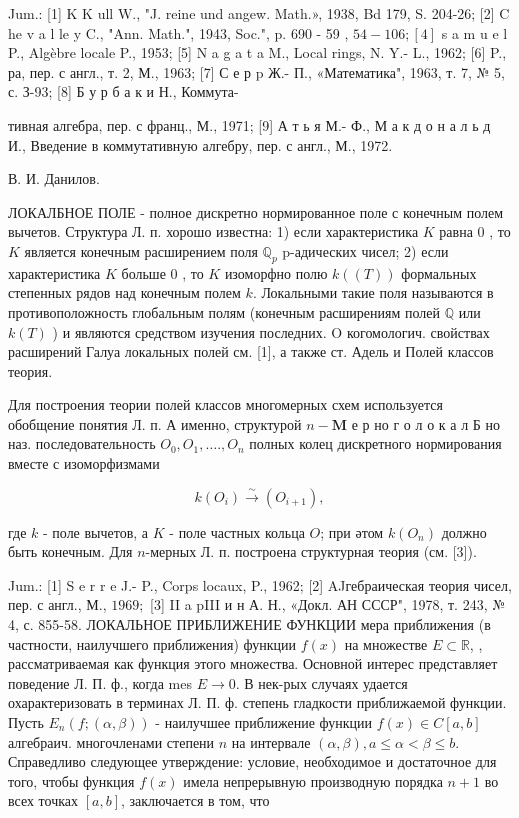\documentclass[10pt]{article}
\begin{document}
Jum.: [1] K $\mathrm{K}$ ull $\mathrm{W} .$, "J. reine und angew. Math.», 1938, Bd 179, S. 204-26; [2] C he v a l le y C., "Ann. Math.", 1943, Soc.", p. 690 - 59 , $54-106 ;[4]$ s a m u e l P., Algèbre locale P., 1953; [5] N a g a t a M., Local rings, N. Y.- L., 1962; [6] P., ра, пер. с англ., т. 2, М., 1963; [7] С е р p Ж.- П., «Математика", 1963, т. 7, № 5, с. З-93; [8] Б у р б а к и Н., Коммута-

тивная алгебра, пер. с франц., М., 1971; [9] А т ь я М.- Ф., М а к д о н а л ь д И., Введение в коммутативную алгебру, пер. с англ., М., 1972.



В. И. Данилов.



ЛОКАЛБНОЕ ПОЛЕ - полное дискретно нормированное поле с конечным полем вычетов. Структура Л. п. хорошо известна: 1) если характеристика $K$ равна 0 , то $K$ является конечным расширением поля $\mathbb{Q}_{p}$ p-адических чисел; 2) если характеристика $K$ больше 0 , то $K$ изоморфно полю $k((T))$ формальных степенных рядов над конечным полем $k$. Локальными такие поля называются в противоположность глобальным полям (конечным расширениям полей $\mathbb{Q}$ или $k(T)$ ) и являются средством изучения последних. $\mathrm{O}$ когомологич. свойствах расширений Галуа локальных полей см. [1], а также ст. Адель и Полей классов теория.



Для построения теории полей классов многомерных схем используется обобщение понятия Л. п. А именно, структурой $n-\mathbf{M}$ е р но г о л о к а л Б но наз. последовательность $O_{0}, O_{1}, \ldots ., O_{n}$ полных колец дискретного нормирования вместе с изоморфизмами



\[

k\left(O_{i}\right) \stackrel{\sim}{\rightarrow}\left(O_{i+1}\right),

\]



где $k$ - поле вычетов, а $K$ - поле частных кольца $O$; при әтом $k\left(O_{n}\right)$ должно быть конечным. Для $n$-мерных Л. п. построена структурная теория (см. [3]).



Jum.: [1] S e r r e J.- P., Corps locaux, P., 1962; [2] AJгебраическая теория чисел, пер. с англ., М., $1969 ;$ [3] II a pIII и н А. Н., «Докл. АН СССР", 1978, т. 243, № 4, с. 855-58. ЛОКАЛЬНОЕ ПРИБЛИЖЕНИЕ ФУНКЦИИ мера приближения (в частности, наилучшего приближения) функции $f(x)$ на множестве $E \subset \mathbb{R}$, , рассматриваемая как функция этого множества. Основной интерес представляет поведение Л. П. ф., когда mes $E \rightarrow 0$. В нек-рых случаях удается охарактеризовать в терминах Л. П. ф. степень гладкости приближаемой функции. Пусть $E_{n}(f ;(\alpha, \beta))$ - наилучшее приближение функции $f(x) \in C[a, b]$ алгебраич. многочленами степени $n$ на интервале $(\alpha, \beta), a \leqslant \alpha<\beta \leqslant b$. Справедливо следующее утверждение: условие, необходимое и достаточное для того, чтобы функция $f(x)$ имела непрерывную производную порядка $n+1$ во всех точках $[a, b]$, заключается в том, что
\end{document}
